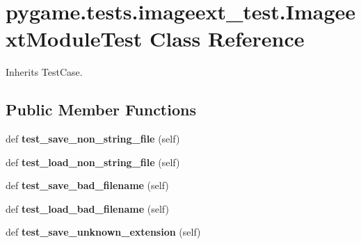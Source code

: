\hypertarget{classpygame_1_1tests_1_1imageext__test_1_1_imageext_module_test}{}\section{pygame.\+tests.\+imageext\+\_\+test.\+Imageext\+Module\+Test Class Reference}
\label{classpygame_1_1tests_1_1imageext__test_1_1_imageext_module_test}


Inherits Test\+Case.

\subsection*{Public Member Functions}
\begin{DoxyCompactItemize}
\item 
\mbox{\label{classpygame_1_1tests_1_1imageext__test_1_1_imageext_module_test_aa52305a400d8d5373aeeb74d32b975f3}} 
def {\bfseries test\+\_\+save\+\_\+non\+\_\+string\+\_\+file} (self)
\item 
\mbox{\label{classpygame_1_1tests_1_1imageext__test_1_1_imageext_module_test_a4f82b51bc80d5c2df115e0d092da0cc7}} 
def {\bfseries test\+\_\+load\+\_\+non\+\_\+string\+\_\+file} (self)
\item 
\mbox{\label{classpygame_1_1tests_1_1imageext__test_1_1_imageext_module_test_a86e33416cbc52dd8e9faff50b232a340}} 
def {\bfseries test\+\_\+save\+\_\+bad\+\_\+filename} (self)
\item 
\mbox{\label{classpygame_1_1tests_1_1imageext__test_1_1_imageext_module_test_a546fa801c6556c5e3de0176bb60a9af3}} 
def {\bfseries test\+\_\+load\+\_\+bad\+\_\+filename} (self)
\item 
\mbox{\label{classpygame_1_1tests_1_1imageext__test_1_1_imageext_module_test_ae681eef021eaeab8b4793ae06a6e4431}} 
def {\bfseries test\+\_\+save\+\_\+unknown\+\_\+extension} (self)
\item 

\end{DoxyCompactItemize}
